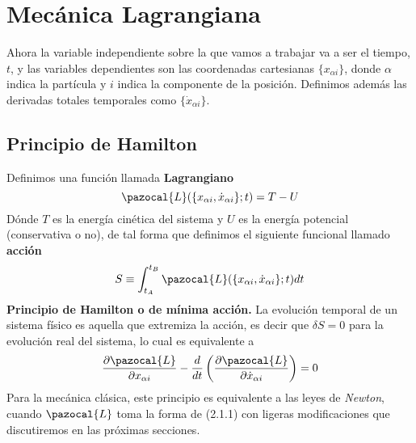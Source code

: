 \chapter{Mecánica Lagrangiana}
Ahora la variable independiente sobre la que vamos a trabajar va a ser el tiempo, $t$, y las variables dependientes son las coordenadas cartesianas $\{x_{\alpha i}\}$, donde $\alpha$ indica la partícula y $i$ indica la componente de la posición.
Definimos además las derivadas totales temporales como $\{\dot{x}_{\alpha i}\}$.

\section{Principio de Hamilton}

Definimos una función llamada \textbf{Lagrangiano}
\begin{equation} \label{2.1.1}
    \pazocal{L}(\{x_{\alpha i},\dot{x}_{\alpha i}\};t)=T-U
\end{equation} 
Dónde $T$ es la energía cinética del sistema y $U$ es la energía potencial (conservativa o no), de tal forma que definimos el siguiente funcional llamado \textbf{acción}
\begin{equation} \label{2.1.2}
    S \equiv \int_{t_A}^{t_B}{\pazocal{L}(\{x_{\alpha i},\dot{x}_{\alpha i}\};t)dt}
\end{equation} 
\textbf{Principio de Hamilton o de mínima acción.} La evolución temporal de un sistema físico es aquella que extremiza la acción, es decir que $\delta S = 0$ para la evolución real del sistema, lo cual es equivalente a
\begin{equation} \label{2.1.3}
    \frac{\partial \pazocal{L}}{\partial x_{\alpha i}} -\frac{d}{dt}\left(\frac{\partial \pazocal{L}}{\partial \dot{x}_{\alpha i}}\right) =0
\end{equation} 
Para la mecánica clásica, este principio es equivalente a las leyes de \textit{Newton}, cuando $\pazocal{L}$ toma la forma de (2.1.1) con ligeras modificaciones que discutiremos en las próximas secciones.
